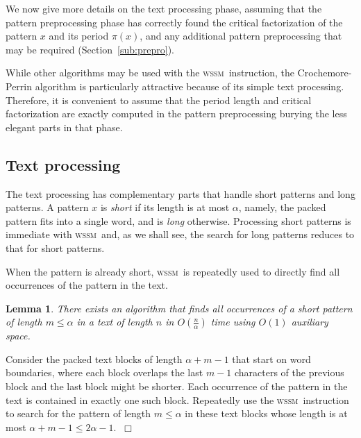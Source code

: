 \documentclass[12pt]{article}
\newtheorem{lemma}[theorem]{Lemma}
\newenvironment{proof}{\noindent{\bf Proof.\/}}{$~\Box$ \newline}
\newcommand{\C}{{\alpha}}
\newcommand{\wssm}{\textsc{wssm}}
\begin{document}
We now give more details on the text processing phase, assuming that
the pattern preprocessing phase has correctly found the critical
factorization of the pattern $x$ and its period $\pi(x)$, and any
additional pattern preprocessing that may be required (Section~\ref{sub:prepro}).

While other algorithms may be used with the \wssm\ instruction,
the Crochemore-Perrin algorithm is particularly attractive because
of its simple text processing. %
Therefore, it is convenient to assume that the period length and critical
factorization are exactly computed in the pattern preprocessing
burying the less elegant parts in that phase.


\subsection{Text processing}
\label{sub:text-processing}

The text processing has 
complementary parts that %
handle short patterns and long patterns.
A pattern $x$ is {\em short} if its length is at most $\C$,
namely, the packed pattern fits into a single  word,
and is {\em long} otherwise.
Processing short patterns is immediate with \wssm\
and, as we shall see, the search for long patterns 
reduces to that for short patterns. %

\smallskip{} \label{veryshort}
%
When the pattern is already short, \wssm\ is repeatedly used to directly find all 
occurrences of the pattern in the text.

\begin{lemma}
\label{lemma:veryshort}
There exists an algorithm that finds all occurrences of a short pattern
of length $m\leq \C$ in a text of length $n$ in $O\!\left(\frac{n}{\C}\right)$ time 
using $O(1)$ auxiliary space.
\end{lemma}

\begin{proof}
Consider the packed text blocks of length $\C+m-1$ that start on word boundaries, 
where each block overlaps the last $m-1$ characters of the previous block
and the last block might be shorter.
Each occurrence of the pattern in the 
text is contained in exactly one such block. 
Repeatedly use the \wssm\ instruction to search for the pattern 
of length $m\leq \C$ in these text blocks
whose length is at most $\C+m-1\leq 2\C-1$. 
\end{proof}
\end{document}
